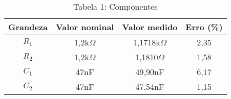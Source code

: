 \vspace{5pt}
\begin{table}[h]
\centering
\begin{tabular}{|c|c|c|c|}
\hline
\textbf{Grandeza} & \textbf{Valor nominal} & \textbf{Valor medido} & \textbf{Erro (\%)} \\\hline
$R_1$ & 1,2k$\Omega$ & 1,1718k$\Omega$ & 2,35\\\hline
$R_2$ & 1,2k$\Omega$ & 1,1810$\Omega$ & 1,58\\\hline
$C_1$ & 47nF & 49,90nF & 6,17\\\hline
$C_2$ & 47nF & 47,54nF & 1,15\\\hline
\end{tabular}
\caption*{Tabela 1: Componentes}
\end{table}
